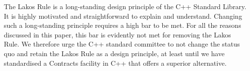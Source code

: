 The Lakos Rule is a long-standing design principle of the C++ Standard Library. It is highly motivated and straightforward to explain and understand. Changing such a long-standing principle requires a high bar to be met. For all the reasons discussed in this paper, this bar is evidently not met for removing the Lakos Rule. We therefore urge the C++ standard committee to not change the status quo and retain the Lakos Rule as a design principle, at least until we have standardised a Contracts facility in C++ that offers a superior alternative.





\renewcommand{\bibname}{References}



